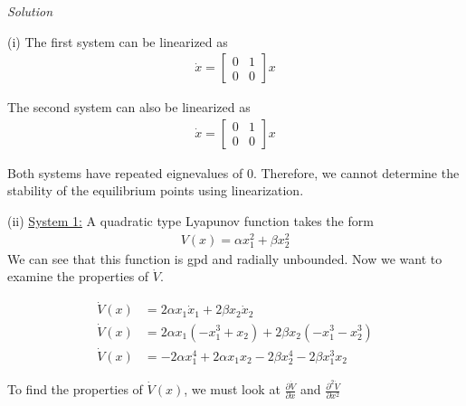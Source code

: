 \documentclass{article}
\begin{document}
  \noindent \textit{Solution} \newline \newline

  (i) The first system can be linearized as
  \begin{align*}
    \dot{x} =
    \begin{bmatrix}
      0 & 1 \\
      0 & 0
    \end{bmatrix} x
  \end{align*}
  
  The second system can also be linearized as
  \begin{align*}
    \dot{x} =
    \begin{bmatrix}
      0 & 1 \\
      0 & 0
    \end{bmatrix} x
  \end{align*}

  Both systems have repeated eignevalues of 0. Therefore, we cannot determine
  the stability of the equilibrium points using linearization. \newline \newline

  (ii) \underline{System 1:} A quadratic type Lyapunov function takes the form
  \begin{align*}
    V(x) = \alpha x_1^2 + \beta x_2^2
  \end{align*}
  We can see that this function is gpd and radially unbounded. Now we want to
  examine the properties of $\dot{V}$.

  \begin{align*}
    \dot{V}(x) &= 2\alpha x_1\dot{x}_1 + 2\beta x_2\dot{x}_2 \\
    \dot{V}(x) &= 2\alpha x_1(-x_1^3 + x_2) + 2\beta x_2(-x_1^3 - x_2^3) \\
    \dot{V}(x) &= -2\alpha x_1^4 + 2\alpha x_1x_2 - 2\beta x_2^4 -2\beta x_1^3x_2 
  \end{align*}

  \noindent To find the properties of $\dot{V}(x)$, we must look at $\frac{\partial
    \dot{V}}{\partial x}$ and $\frac{\partial^2 \dot{V}}{\partial x^2}$
\end{document}
